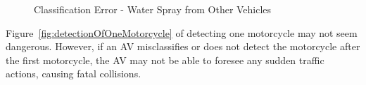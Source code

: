 \documentclass[12pt]{report} %
\begin{document}
\begin{figure}[h]
\begin{floatrow}
			{
				\caption{Classification Error - Water Spray from Other Vehicles}
				\label{fig:detectionOfMotorcycleW3}
			}
		\end{floatrow}
	\end{figure}

	Figure~\ref{fig:detectionOfOneMotorcycle} of detecting one motorcycle may not seem dangerous. However, if an AV misclassifies or does not detect the motorcycle after the first motorcycle, the AV may not be able to foresee any sudden traffic actions, causing fatal collisions.
\end{document}

